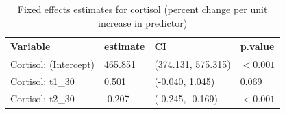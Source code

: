 \begin{table}[!h]
\centering
\caption{Fixed effects estimates for cortisol (percent change per unit increase in predictor)}
\centering
\begin{tabular}[t]{llll}
\toprule
Variable & estimate & CI & p.value\\
\midrule
Cortisol: (Intercept) & 465.851 & (374.131, 575.315) & $<0.001$\\
Cortisol: t1_30 & 0.501 & (-0.040, 1.045) & 0.069\\
Cortisol: t2_30 & -0.207 & (-0.245, -0.169) & $<0.001$\\
\bottomrule
\end{tabular}
\end{table}
